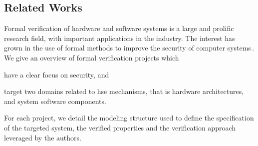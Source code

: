 %


\subsection{Related Works}
\label{subsec:sota:ltsrelated}

Formal verification of hardware and software systems is a large and prolific
research field, with important applications in the industry.
%
The interest has grown in the use of formal methods to improve the security of
computer systems\,\cite{chong2016report}.
%
We give an overview of formal verification projects which
%
\begin{inparaenum}[(1)]
\item have a clear focus on security, and
\item target two domains related to \ac{hse} mechanisms, that is hardware
  architectures, and system software components.
\end{inparaenum}
%
For each project, we detail the modeling structure used to define the
specification of the targeted system, the verified properties and the
verification approach leveraged by the authors.

